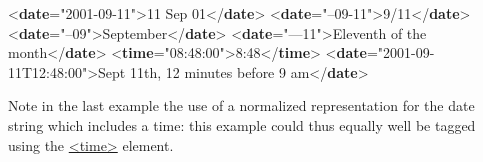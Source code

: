 \begin{shaded}
{<\textbf{date}\hspace*{1em}{when}="{2001-09-11}">}11 Sep 01{</\textbf{date}>}\mbox{}\newline 
{<\textbf{date}\hspace*{1em}{when}="{--09-11}">}9/11{</\textbf{date}>}\mbox{}\newline 
{<\textbf{date}\hspace*{1em}{when}="{--09}">}September{</\textbf{date}>}\mbox{}\newline 
{<\textbf{date}\hspace*{1em}{when}="{---11}">}Eleventh of the month{</\textbf{date}>}\mbox{}\newline 
{<\textbf{time}\hspace*{1em}{when}="{08:48:00}">}8:48{</\textbf{time}>}\mbox{}\newline 
{<\textbf{date}\hspace*{1em}{when}="{2001-09-11T12:48:00}">}Sept 11th, 12 minutes before 9 am{</\textbf{date}>}\end{shaded}\egroup\par \noindent Note in the last example the use of a normalized representation for the date string which includes a time: this example could thus equally well be tagged using the \hyperref[TEI.time]{<time>} element.\par
